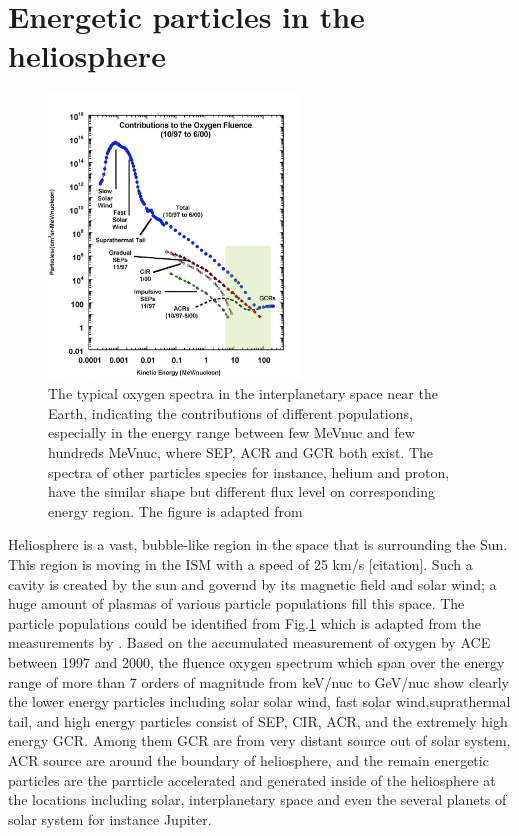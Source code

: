 \section{Energetic particles in the heliosphere}
\label{sec:particles_heliosphere}

\begin{figure}
	\centering
	\includegraphics[width = 0.6\textwidth]{images/heliospheric_particle_spectra_color.png}
	\caption[Energy spectra of oxygen ions in the near Earth space]{The typical oxygen spectra in the interplanetary space near the Earth, indicating the contributions of different populations, especially in the energy range between few MeV\/nuc and few hundreds MeV\/nuc, where \acs{SEP}, \acs{ACR} and \acs{GCR} both exist. The spectra of other particles species for instance, helium and proton, have the similar shape but different flux level on corresponding energy region. The figure is adapted from \cite{Mewaldt-2001}}
	\label{Fig:Oxygen_spectra_heliosphere}
\end{figure}

Heliosphere is a vast, bubble-like region in the space that is surrounding the Sun. This region is moving in the \ac{ISM} with a speed of 25 km/s [citation]. Such a cavity is created by the sun and governd by its magnetic field and solar wind; a huge amount of plasmas of various particle populations fill this space. The particle populations could be identified from Fig.\ref{Fig:Oxygen_spectra_heliosphere} which is adapted from the measurements by \citep{Mewaldt-2001}. Based on the accumulated measurement of oxygen by \ac{ACE} between 1997 and 2000, the fluence oxygen spectrum which span over the energy range of more than 7 orders of magnitude from keV/nuc to GeV/nuc show clearly the lower energy particles including solar solar wind, fast solar wind,suprathermal tail, and high energy particles consist of \ac{SEP}, \ac{CIR}, \ac{ACR}, and the extremely high energy \ac{GCR}. 
Among them \acs{GCR} are from very distant source out of solar system, \acs{ACR} source are around the boundary of heliosphere, and the remain energetic particles are the parrticle accelerated and generated inside of the heliosphere at the locations including solar, interplanetary space and even the several planets of solar system for instance Jupiter.

